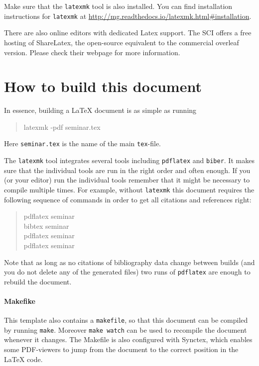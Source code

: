 \documentclass[]{rptuseminar}
\newenvironment{displayshellcommand}{%
	\begin{quote}%
	\ttfamily%
}{%
	\end{quote}%
}
\begin{document}
Make sure that the \lstinline!latexmk! tool is also installed.
You can find installation instructions for \lstinline!latexmk! at \url{http://mg.readthedocs.io/latexmk.html#installation}.

There are also online editors with dedicated Latex support.
The SCI offers a free hosting of ShareLatex, the open-source equivalent to the commercial overleaf version.
Please check their webpage for more information.

\section{How to build this document}
In essence, building a \LaTeX{} document is as simple as running
\begin{displayshellcommand}
	latexmk -pdf seminar.tex
\end{displayshellcommand}
Here \lstinline!seminar.tex! is the name of the main \texttt{tex}-file.

The \lstinline!latexmk! tool integrates several tools including \lstinline!pdflatex! and \lstinline!biber!.
It makes sure that the individual tools are run in the right order and often enough.
If you (or your editor) run the individual tools remember that it might be necessary to compile multiple times.
For example, without \lstinline!latexmk! this document requires the following sequence of commands in order to get all citations and references right:
\begin{displayshellcommand}
  pdflatex seminar \\
  bibtex    seminar \\
  pdflatex seminar \\
  pdflatex seminar
\end{displayshellcommand}
Note that as long as no citations of bibliography data change between builds (and you do not delete any of the generated files) two runs of \texttt{pdflatex} are enough to rebuild the document.

\paragraph{Makefike} This template also contains a \lstinline!makefile!, so that this document can be compiled by running \lstinline!make!.
Moreover \lstinline!make watch! can be used to recompile the document whenever it changes.
The Makefile is also configured with Synctex, which enables some PDF-viewers to jump from the document to the correct position in the \LaTeX{} code.
\end{document}

